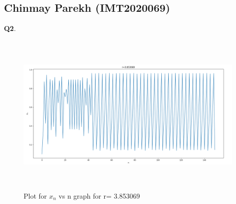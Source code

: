 \documentclass[11pt]{scrartcl} %
\begin{document}
\subsection{Chinmay Parekh (IMT2020069)}
\textbf{Q2}.
\begin{figure}[h] %
	\centering
	\includegraphics[width=12cm, height=8cm]{chinmay69.png} %
	\caption {Plot for $x_n$ vs n graph for r= 3.853069}
\end{figure}
\end{document}
